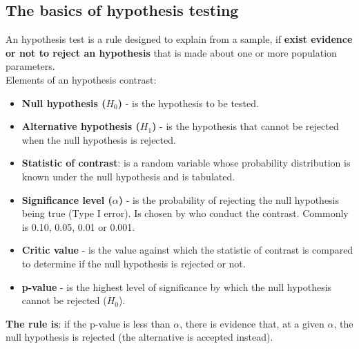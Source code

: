 \documentclass[10pt, a4paper, landscape]{extarticle}
\begin{document}
\begin{multicols}{3}
	\subsection*{The basics of hypothesis testing}
		An hypothesis test is a rule designed to explain from a sample, if \textbf{exist evidence or not to reject an hypothesis} that is made about one or more population parameters.
		\\ Elements of an hypothesis contrast:
		\begin{itemize}[leftmargin=*]
			\item \textbf{Null hypothesis ($H_0$)} - is the hypothesis to be tested.
			\item \textbf{Alternative hypothesis ($H_1$)} - is the hypothesis that cannot be rejected when the null hypothesis is rejected.
			\item \textbf{Statistic of contrast}: is a random variable whose probability distribution is known under the null hypothesis and is tabulated.
			\item \textbf{Significance level ($\alpha$)} - is the probability of rejecting the null hypothesis being true (Type I error). Is chosen by who conduct the contrast. Commonly is 0.10, 0.05, 0.01 or 0.001.
			\item \textbf{Critic value} - is the value against which the statistic of contrast is compared to determine if the null hypothesis is rejected or not.
			\item \textbf{p-value} - is the highest level of significance by which the null hypothesis cannot be rejected ($H_0$).
		\end{itemize}
		\textbf{The rule is}: if the p-value is less than $\alpha$, there is evidence that, at a given $\alpha$, the null hypothesis is rejected (the alternative is accepted instead).

\end{multicols}
\end{document}
